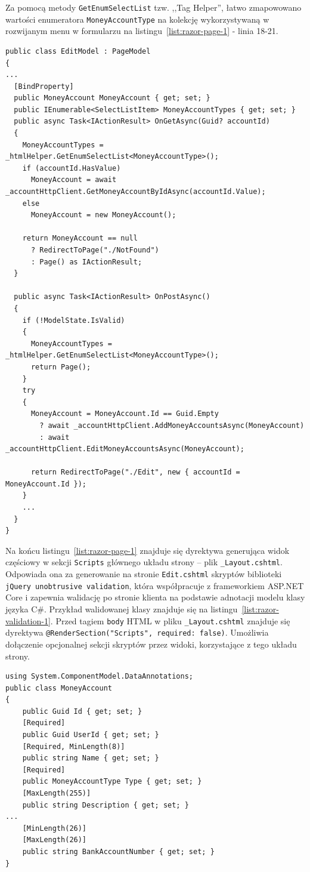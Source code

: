 Za pomocą metody \texttt{GetEnumSelectList} tzw. ,,Tag Helper'', łatwo zmapowowano wartości enumeratora \texttt{MoneyAccountType} na kolekcję wykorzystywaną w rozwijanym menu w formularzu na listingu~\ref{list:razor-page-1} - linia 18-21.

{\belowcaptionskip=-10pt
\begin{lstlisting}[label=list:razor-page-model-1,
    caption=Przykład modelu strony Razor Page: \texttt{EditPage.cs}]
public class EditModel : PageModel
{
...
  [BindProperty]
  public MoneyAccount MoneyAccount { get; set; }
  public IEnumerable<SelectListItem> MoneyAccountTypes { get; set; }
  public async Task<IActionResult> OnGetAsync(Guid? accountId)
  {
    MoneyAccountTypes = _htmlHelper.GetEnumSelectList<MoneyAccountType>();
    if (accountId.HasValue)
      MoneyAccount = await _accountHttpClient.GetMoneyAccountByIdAsync(accountId.Value);
    else
      MoneyAccount = new MoneyAccount();
    
    return MoneyAccount == null 
      ? RedirectToPage("./NotFound")
      : Page() as IActionResult;
  }

  public async Task<IActionResult> OnPostAsync()
  {
    if (!ModelState.IsValid)
    {
      MoneyAccountTypes = _htmlHelper.GetEnumSelectList<MoneyAccountType>();
      return Page();
    }
    try
    {
      MoneyAccount = MoneyAccount.Id == Guid.Empty 
        ? await _accountHttpClient.AddMoneyAccountsAsync(MoneyAccount)
        : await _accountHttpClient.EditMoneyAccountsAsync(MoneyAccount);

      return RedirectToPage("./Edit", new { accountId = MoneyAccount.Id });
    }
    ...
  }
}
\end{lstlisting}
}

Na końcu listingu~\ref{list:razor-page-1} znajduje się dyrektywa generująca widok częściowy w sekcji \texttt{Scripts} głównego układu strony -- plik \texttt{\_Layout.cshtml}. Odpowiada ona za generowanie na stronie \texttt{Edit.cshtml} skryptów biblioteki \texttt{jQuery unobtrusive validation}, która współpracuje z frameworkiem ASP.NET Core i zapewnia walidację po stronie klienta na podstawie adnotacji modelu klasy języka C\#. Przykład walidowanej klasy znajduje się na listingu~\ref{list:razor-validation-1}. Przed tagiem \texttt{body} HTML w pliku \texttt{\_Layout.cshtml} znajduje się dyrektywa \texttt{@RenderSection("Scripts", required: false)}. Umożliwia dołączenie opcjonalnej sekcji skryptów przez widoki, korzystające z tego układu strony.


{\belowcaptionskip=-10pt
\begin{lstlisting}[label=list:razor-validation-1,
    caption=Przykład klasy z adnotacjami]
using System.ComponentModel.DataAnnotations;
public class MoneyAccount
{
    public Guid Id { get; set; }
    [Required]
    public Guid UserId { get; set; }
    [Required, MinLength(8)]
    public string Name { get; set; }
    [Required]
    public MoneyAccountType Type { get; set; }
    [MaxLength(255)]
    public string Description { get; set; }
...
    [MinLength(26)]
    [MaxLength(26)]
    public string BankAccountNumber { get; set; }
}
\end{lstlisting}
}
